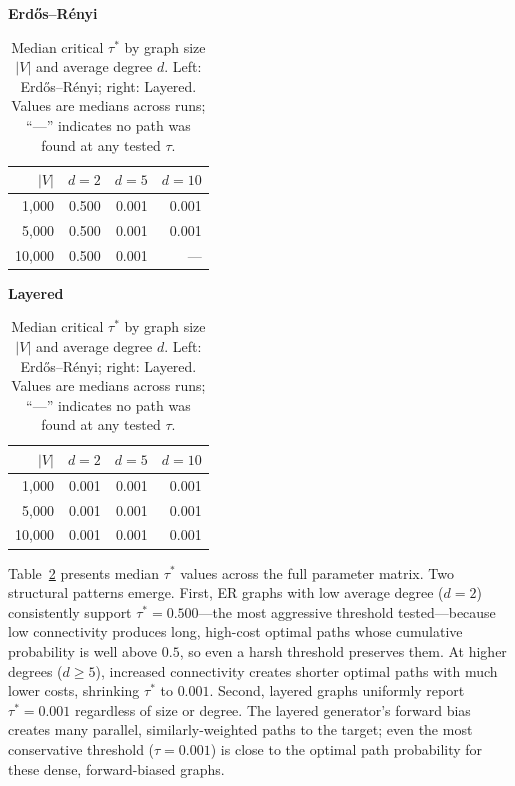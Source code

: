 \begin{table}[htbp]
\centering
\renewcommand{\arraystretch}{1.3}
\caption[Median critical $\tau^*$ heatmap]{Median critical $\tau^*$ by graph size $|V|$ and average degree $d$. Left: Erd\H{o}s--R\'{e}nyi; right: Layered. Values are medians across runs; ``---'' indicates no path was found at any tested $\tau$.}
\label{table:critical_tau_heatmap}
\vspace{4pt}
\begin{minipage}[t]{0.48\textwidth}
\centering
\small
\textbf{Erd\H{o}s--R\'{e}nyi}
\vspace{2pt}

\begin{tabular}{@{}rrrr@{}}
\toprule
$|V|$ & $d{=}2$ & $d{=}5$ & $d{=}10$ \\
\midrule
1{,}000  & 0.500 & 0.001 & 0.001 \\
5{,}000  & 0.500 & 0.001 & 0.001 \\
10{,}000 & 0.500 & 0.001 & --- \\
\bottomrule
\end{tabular}
\end{minipage}%
\hfill
\begin{minipage}[t]{0.48\textwidth}
\centering
\small
\textbf{Layered}
\vspace{2pt}

\begin{tabular}{@{}rrrr@{}}
\toprule
$|V|$ & $d{=}2$ & $d{=}5$ & $d{=}10$ \\
\midrule
1{,}000  & 0.001 & 0.001 & 0.001 \\
5{,}000  & 0.001 & 0.001 & 0.001 \\
10{,}000 & 0.001 & 0.001 & 0.001 \\
\bottomrule
\end{tabular}
\end{minipage}
\end{table}

Table~\ref{table:critical_tau_heatmap} presents median $\tau^*$ values across the full parameter matrix. Two structural patterns emerge. First, ER graphs with low average degree ($d{=}2$) consistently support $\tau^* = 0.500$---the most aggressive threshold tested---because low connectivity produces long, high-cost optimal paths whose cumulative probability is well above $0.5$, so even a harsh threshold preserves them. At higher degrees ($d \geq 5$), increased connectivity creates shorter optimal paths with much lower costs, shrinking $\tau^*$ to $0.001$. Second, layered graphs uniformly report $\tau^* = 0.001$ regardless of size or degree. The layered generator's forward bias creates many parallel, similarly-weighted paths to the target; even the most conservative threshold ($\tau = 0.001$) is close to the optimal path probability for these dense, forward-biased graphs.

